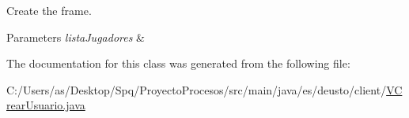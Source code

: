 Create the frame. 
\begin{DoxyParams}{Parameters}
{\em lista\+Jugadores} & \\
\hline
\end{DoxyParams}


The documentation for this class was generated from the following file\+:\begin{DoxyCompactItemize}
\item 
C\+:/\+Users/as/\+Desktop/\+Spq/\+Proyecto\+Procesos/src/main/java/es/deusto/client/\mbox{\hyperlink{_v_crear_usuario_8java}{V\+Crear\+Usuario.\+java}}\end{DoxyCompactItemize}
